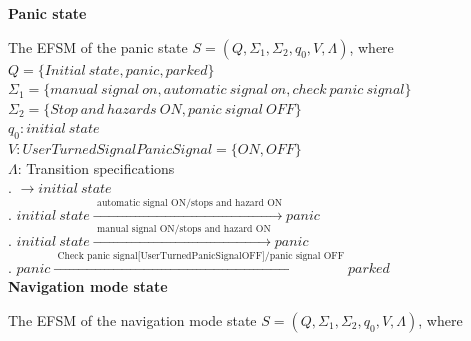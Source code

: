 \documentclass[12pt]{article}
\begin{document}
\begin{spacing}{1.5}
\newpage
\noindent \textbf{Panic state}

\noindent The EFSM of the panic state $S = (Q, \Sigma_1, \Sigma_2, q_0, V, \Lambda)$, where\\

\noindent $Q = \{Initial~state,panic,parked\}$\\
\noindent $\Sigma_1 = \{manual~signal~on,automatic~signal~on,check~panic~signal\}$\\
\noindent $\Sigma_2 = \{Stop~and~hazards~ON,panic~signal~OFF\}$\\
\noindent $q_0: initial~state$\\
\noindent $V: UserTurnedSignalPanicSignal = \{ON, OFF\}$\\
\noindent $\Lambda$: Transition specifications\\
. $\rightarrow initial~state$\\
. $initial~state \xrightarrow {\text { automatic~signal~ON/stops~and~hazard~ON}} panic$\\
. $initial~state \xrightarrow {\text { manual~signal~ON/stops~and~hazard~ON}} panic$\\
. $panic \xrightarrow {\text { Check~panic~signal[UserTurnedPanicSignalOFF]/panic~signal~OFF}} parked$\\
\newpage
\noindent \textbf{Navigation mode state}

\noindent The EFSM of the navigation mode state $S = (Q, \Sigma_1, \Sigma_2, q_0, V, \Lambda)$, where\\


\end{spacing}
\end{document}
